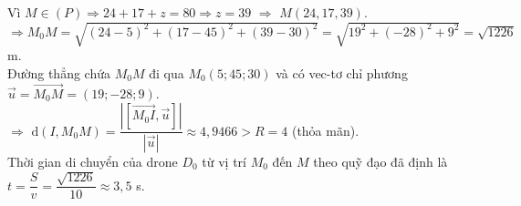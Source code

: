 \begin{bt}
{		Vì $M \in (P) \Rightarrow  24+17+z=80 \Rightarrow z=39$ $\Rightarrow$ $M(24,17,39)$.\\
		 $\Rightarrow M_0M=\sqrt{(24-5)^2+(17-45)^2+(39-30)^2}=\sqrt{19^2+(-28)^2+9^2}=\sqrt{1226}$ m.\\
		Đường thẳng chứa $M_0M$ đi qua $M_0(5;45;30)$ và  có vec-tơ chỉ phương $\overrightarrow{u}=\overrightarrow{M_0M}=(19;-28;9)$.\\
		$\Rightarrow$ $\mathrm{d}(I,M_0M)=\dfrac{\left|\left[\overrightarrow{M_0I},\overrightarrow{u}\right]\right|}{\left|\overrightarrow{u}\right|}  \approx 4{,}9466 > R=4$ (thỏa mãn).\\
		Thời gian di chuyển của drone $D_0$ từ vị trí $M_0$ đến  $M$ theo quỹ đạo đã định là $t=\dfrac{S}{v}=\dfrac{\sqrt{1226}}{10}\approx 3{,}5$ s.
	} 
\end{bt}

